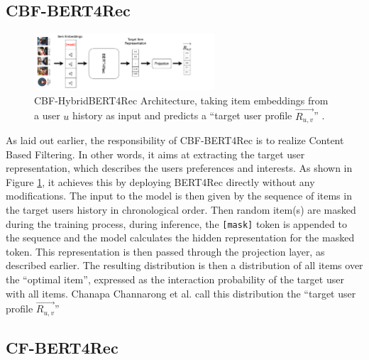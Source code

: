 \documentclass{Academic}
\begin{document}
        \subsection{CBF-BERT4Rec}
        \begin{figure}[ht!]
            \centering
            \includegraphics[width=0.6\textwidth]{images/CBF-HybridBERT4Rec.pdf}
            \caption{CBF-HybridBERT4Rec Architecture, taking item embeddings from a user $u$ history as input and predicts a \enquote{target user profile $\overrightarrow{R_{u,v}}$} \cite{channarongHybridBERT4RecHybridContentBased2022}.}
            \label{fig:cbf-arch}
        \end{figure}
        As laid out earlier, the responsibility of CBF-BERT4Rec is to realize Content Based Filtering. In other words, it aims at extracting the target user representation, which describes the users preferences and interests. As shown in Figure \ref{fig:cbf-arch}, it achieves this by deploying BERT4Rec directly without any modifications. The input to the model is then given by the sequence of items in the target users history in chronological order. Then random item(s) are masked during the training process, during inference, the \texttt{[mask]} token is appended to the sequence and the model calculates the hidden representation for the masked token. This representation is then passed through the projection layer, as described earlier. The resulting distribution is then a distribution of all items over the \enquote{optimal item}, expressed as the interaction probability of the target user with all items. Chanapa Channarong et al. \cite{channarongHybridBERT4RecHybridContentBased2022} call this distribution the \enquote{target user profile $\overrightarrow{R_{u,v}}$}
        \FloatBarrier

        \subsection{CF-BERT4Rec}
        
\end{document}
